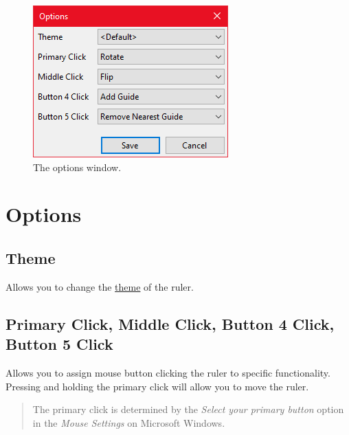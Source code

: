 \documentclass[
]{book}
\begin{document}
\begin{figure}
\includegraphics[width=1\linewidth]{images/options} \caption{The options window.}\label{fig:unnamed-chunk-2}
\end{figure}

\hypertarget{options}{%
\section{Options}\label{options}}

\hypertarget{theme}{%
\subsection{Theme}\label{theme}}

Allows you to change the \protect\hyperlink{themes}{theme} of the ruler.

\hypertarget{primary-click-middle-click-button-4-click-button-5-click}{%
\subsection{Primary Click, Middle Click, Button 4 Click, Button 5 Click}\label{primary-click-middle-click-button-4-click-button-5-click}}

Allows you to assign mouse button clicking the ruler to specific functionality.
Pressing and holding the primary click will allow you to move the ruler.

\begin{quote}
The primary click is determined by the \emph{Select your primary button} option in the \emph{Mouse Settings} on Microsoft Windows.
\end{quote}
\end{document}
